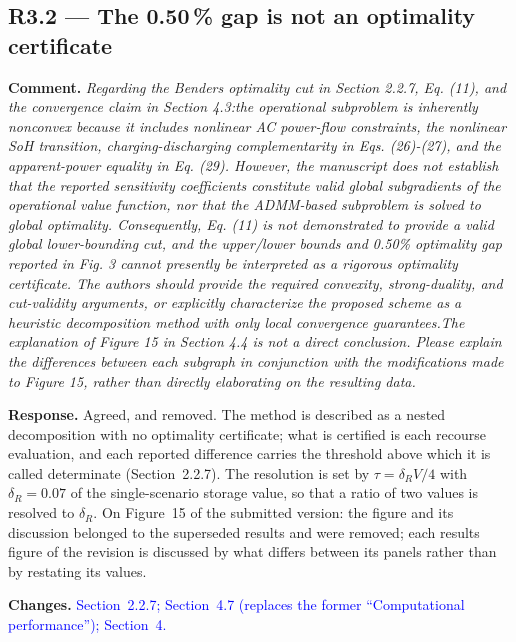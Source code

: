 \documentclass[11pt]{article}
\newcommand{\rcomment}[1]{\par\medskip\noindent\textbf{Comment.} \textit{#1}\par\smallskip}
\newcommand{\rresponse}[1]{\noindent\textbf{Response.} #1\par\smallskip}
\newcommand{\rchanges}[1]{\noindent\textbf{Changes.} \textcolor{blue}{#1}\par\medskip}
\begin{document}
\subsection*{R3.2 --- The 0.50\,\% gap is not an optimality certificate}
\rcomment{
Regarding the Benders optimality cut in Section 2.2.7, Eq. (11), and the convergence claim in Section 4.3:the operational subproblem is inherently nonconvex because it includes nonlinear AC power-flow constraints, the nonlinear SoH transition, charging-discharging complementarity in Eqs. (26)-(27), and the apparent-power equality in Eq. (29). However, the manuscript does not establish that the reported sensitivity coefficients constitute valid global subgradients of the operational value function, nor that the ADMM-based subproblem is solved to global optimality. Consequently, Eq. (11) is not demonstrated to provide a valid global lower-bounding cut, and the upper/lower bounds and 0.50\% optimality gap reported in Fig. 3 cannot presently be interpreted as a rigorous optimality certificate. The authors should provide the required convexity, strong-duality, and cut-validity arguments, or explicitly characterize the proposed scheme as a heuristic decomposition method with only local convergence guarantees.The explanation of Figure 15 in Section 4.4 is not a direct conclusion. Please explain the differences between each subgraph in conjunction with the modifications made to Figure 15, rather than directly elaborating on the resulting data.
}
\rresponse{Agreed, and removed. The method is described as a nested decomposition with no optimality
certificate; what is certified is each recourse evaluation, and each reported difference carries the
threshold above which it is called determinate (Section~2.2.7). The resolution is set by
$\tau = \delta_R V/4$ with $\delta_R = 0.07$ of the single-scenario storage value, so that a ratio of
two values is resolved to $\delta_R$. On Figure~15 of the submitted version: the figure and its discussion
belonged to the superseded results and were removed; each results figure of the revision is discussed by
what differs between its panels rather than by restating its values.}
\rchanges{Section~2.2.7; Section~4.7 (replaces the former ``Computational performance''); Section~4.}
\end{document}
